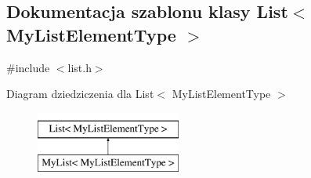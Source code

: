 \hypertarget{class_list}{\subsection{Dokumentacja szablonu klasy List$<$ My\-List\-Element\-Type $>$}
\label{class_list}
}


{\ttfamily \#include $<$list.\-h$>$}

Diagram dziedziczenia dla List$<$ My\-List\-Element\-Type $>$\begin{figure}[H]
\begin{center}
\leavevmode
\includegraphics[height=2.000000cm]{class_list}
\end{center}
\end{figure}
